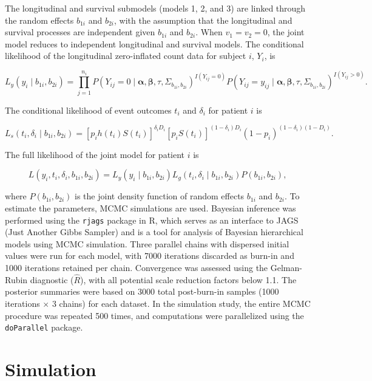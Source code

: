 \documentclass[twoside]{article}
\begin{document}
The longitudinal and survival submodels (models 1, 2, and 3) are linked through the random effects \( b_{1i} \) and \( b_{2i} \), with the assumption that the longitudinal and survival processes are independent given \( b_{1i} \) and \( b_{2i} \). When \( v_1 = v_2 = 0 \), the joint model reduces to independent longitudinal and survival models. The conditional likelihood of the longitudinal zero-inflated count data for subject \( i \), \( Y_i \), is

\[
L_y(y_i \mid b_{1i}, b_{2i}) = \prod_{j=1}^{n_i} P(Y_{ij} = 0 \mid \bm{\alpha}, \bm{\beta}, \tau, \Sigma_{b_{1i}, b_{2i}})^{I(Y_{ij}=0)} P(Y_{ij} = y_{ij} \mid \bm{\alpha}, \bm{\beta}, \tau, \Sigma_{b_{1i}, b_{2i}})^{I(Y_{ij}>0)}.
\]

The conditional likelihood of event outcomes \( t_i \) and \( \delta_i \) for patient \( i \) is

\[
L_s(t_i, \delta_i \mid b_{1i}, b_{2i}) = [p_i h(t_i) S(t_i)]^{\delta_i D_i} [p_i S(t_i)]^{(1-\delta_i) D_i} (1 - p_i)^{(1-\delta_i)(1-D_i)}.
\]

The full likelihood of the joint model for patient \( i \) is

\[
L(y_i, t_i, \delta_i, b_{1i}, b_{2i}) = L_y(y_i \mid b_{1i}, b_{2i}) L_g(t_i, \delta_i \mid b_{1i}, b_{2i}) P(b_{1i}, b_{2i}),
\]

where \( P(b_{1i}, b_{2i}) \) is the joint density function of random effects \( b_{1i} \) and \( b_{2i} \). To estimate the parameters, MCMC simulations are used. Bayesian inference was performed using the \texttt{rjags} package in R, which serves as an interface to JAGS (Just Another Gibbs Sampler) \cite{Plummer:2003} and is a tool for analysis of Bayesian hierarchical models using MCMC simulation. Three parallel chains with dispersed initial values were run for each model, with 7000 iterations discarded as burn-in and 1000 iterations retained per chain. Convergence was assessed using the Gelman-Rubin diagnostic (\( \hat{R} \)), with all potential scale reduction factors below 1.1. The posterior summaries were based on 3000 total post-burn-in samples (1000 iterations \(\times\) 3 chains) for each dataset. In the simulation study, the entire MCMC procedure was repeated 500 times, and computations were parallelized using the \texttt{doParallel} package.

\section{Simulation}
\end{document}
